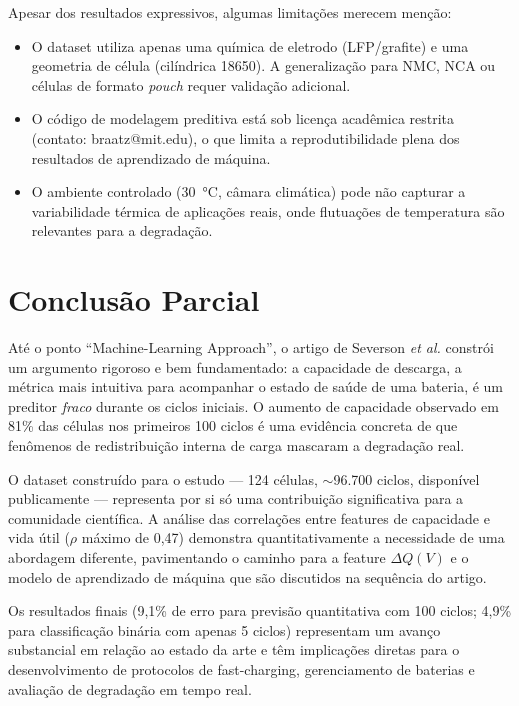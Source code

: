 \documentclass[12pt, a4paper]{article}
\begin{document}
Apesar dos resultados expressivos, algumas limitações merecem menção:

\begin{itemize}
  \item O dataset utiliza apenas uma química de eletrodo (LFP/grafite) e
  uma geometria de célula (cilíndrica 18650). A generalização para NMC,
  NCA ou células de formato \textit{pouch} requer validação adicional.

  \item O código de modelagem preditiva está sob licença acadêmica
  restrita (contato: braatz@mit.edu), o que limita a reprodutibilidade
  plena dos resultados de aprendizado de máquina.

  \item O ambiente controlado (30~°C, câmara climática) pode não capturar
  a variabilidade térmica de aplicações reais, onde flutuações de
  temperatura são relevantes para a degradação.
\end{itemize}

\section{Conclusão Parcial}

Até o ponto ``Machine-Learning Approach'', o artigo de Severson \textit{et
al.} constrói um argumento rigoroso e bem fundamentado: a capacidade de
descarga, a métrica mais intuitiva para acompanhar o estado de saúde de uma
bateria, é um preditor \emph{fraco} durante os ciclos iniciais. O
aumento de capacidade observado em 81\% das células nos primeiros 100 ciclos
é uma evidência concreta de que fenômenos de redistribuição interna de carga
mascaram a degradação real.

O dataset construído para o estudo --- 124 células, $\sim$96.700 ciclos,
disponível publicamente --- representa por si só uma contribuição
significativa para a comunidade científica. A análise das correlações entre
features de capacidade e vida útil ($\rho$ máximo de 0,47) demonstra
quantitativamente a necessidade de uma abordagem diferente, pavimentando o
caminho para a feature $\Delta Q(V)$ e o modelo de aprendizado de máquina
que são discutidos na sequência do artigo.

Os resultados finais (9,1\% de erro para previsão quantitativa com 100
ciclos; 4,9\% para classificação binária com apenas 5 ciclos) representam
um avanço substancial em relação ao estado da arte e têm implicações diretas
para o desenvolvimento de protocolos de fast-charging, gerenciamento de
baterias e avaliação de degradação em tempo real.
\end{document}
